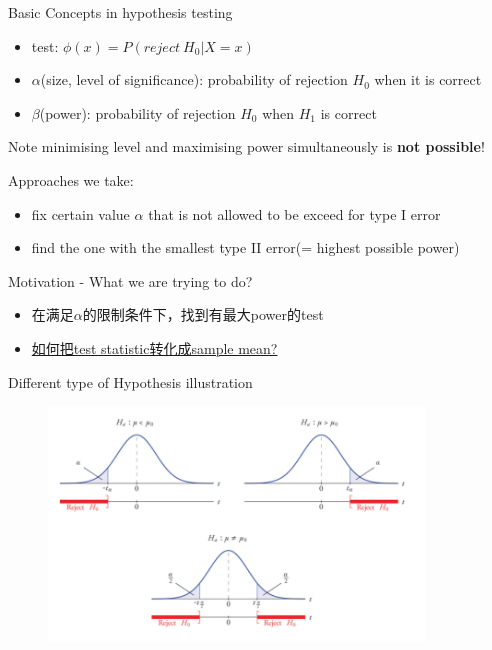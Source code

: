 \documentclass{beamer}
\begin{document}
    \begin{frame}{Basic Concepts in hypothesis testing}
        \begin{itemize}
            \item test: $\phi(x)=P(reject\ H_0|X=x)$
            \item $\alpha$(size, level of significance): probability of rejection $H_0$ when it is correct
            \item $\beta$(power): probability of rejection $H_0$ when $H_1$ is correct
        \end{itemize}
        
        \begin{alertblock}{Note}
        minimising level and maximising power simultaneously is \textbf{not possible}!
        \end{alertblock}
        
        Approaches we take:
        \begin{itemize}
            \item fix certain value $\alpha$ that is not allowed to be exceed for type I error
            \item find the one with the smallest type II error(= highest possible power)
        \end{itemize}
    \end{frame}
    
    \begin{frame}{Motivation - What we are trying to do?}
        \begin{itemize}
            \item 在满足$\alpha$的限制条件下，找到有最大power的test\\
            \item \href{https://onlinecourses.science.psu.edu/stat414/node/305/}{如何把test statistic转化成sample mean?}
        \end{itemize}
    \end{frame}
    
    \begin{frame}{Different type of Hypothesis illustration}
        \begin{figure}
        \centering
        \includegraphics[width=10cm]{cr}
        \end{figure}
    \end{frame}
    
\end{document}
